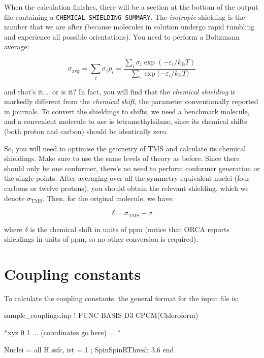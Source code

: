 \documentclass[10pt]{article}
\begin{document}
When the calculation finishes, there will be a section at the bottom of the output file containing a \texttt{CHEMICAL SHIELDING SUMMARY}. The \textit{isotropic} shielding is the number that we are after (because molecules in solution undergo rapid tumbling and experience all possible orientations). You need to perform a Boltzmann average:

\[ \sigma_{\text{avg}} = \sum_i \sigma_i p_i = \frac{\sum_i \sigma_i \exp{(-\varepsilon_i/k_\mathrm{B}T)}}{\sum_i \exp{(-\varepsilon_i/k_\mathrm{B}T})} \]

and that's it...\ or is it? In fact, you will find that the \textit{chemical shielding} is markedly different from the \textit{chemical shift}, the parameter conventionally reported in journals. To convert the shieldings to shifts, we need a benchmark molecule, and a convenient molecule to use is tetramethylsilane, since its chemical shifts (both proton and carbon) should be identically zero.

So, you will need to optimise the geometry of TMS and calculate its chemical shieldings. Make sure to use the same levels of theory as before. Since there should only be one conformer, there's no need to perform conformer generation or the single-points. After averaging over all the symmetry-equivalent nuclei (four carbons or twelve protons), you should obtain the relevant shielding, which we denote \(\sigma_{\text{TMS}}\). Then, for the original molecule, we have:

\[ \delta = \sigma_{\text{TMS}} - \sigma \]

where \(\delta\) is the chemical shift in units of ppm (notice that ORCA reports shieldings in units of ppm, so no other conversion is required).

\section{Coupling constants}

To calculate the coupling constants, the general format for the input file is:

\begin{script}{sample\_couplings.inp}
! FUNC BASIS D3 CPCM(Chloroform)


*xyz 0 1
... (coordinates go here) ...
*

  Nuclei = all H { ssfc, ist = 1 };
  SpinSpinRThresh 3.6
end
\end{script}
\end{document}

